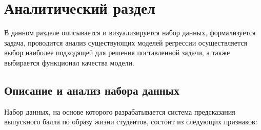 \chapter{Аналитический раздел}

В данном разделе описывается и визуализируется набор данных, формализуется задача, проводится анализ существующих моделей регрессии осуществляется выбор наиболее подходящей для решения поставленной задачи, а также выбирается функционал качества модели.

\section{Описание и анализ набора данных}
Набор данных, на основе которого разрабатывается система предсказания выпускного балла по образу жизни студентов, состоит из следующих признаков:
